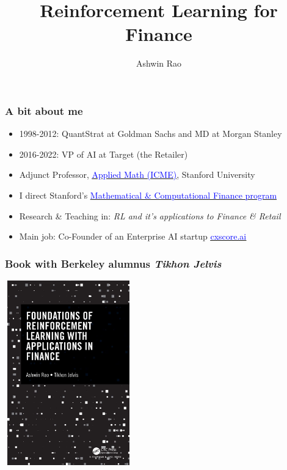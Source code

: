 \documentclass[handout]{beamer}
\title[RL for Finance]{Reinforcement Learning for Finance} %
\author{Ashwin Rao} %
\institute[Stanford] %
{Institute for Computational and Mathematical Engineering\\
Stanford University
}
\date{} %
\begin{document}
\begin{frame}
\titlepage %
\end{frame}



\begin{frame}
\frametitle{A bit about me}
\pause
\begin{itemize}[<+->]
\item 1998-2012: QuantStrat at Goldman Sachs and MD at Morgan Stanley
\item 2016-2022: VP of AI at Target (the Retailer)
\item Adjunct Professor, \href{https://icme.stanford.edu/}{\underline{\textcolor{blue}{Applied Math (ICME)}}}, Stanford University
\item I direct Stanford's \href{https://mcf.stanford.edu/}{\underline{\textcolor{blue}{Mathematical \& Computational Finance program}}}
\item Research \& Teaching in: {\em RL and it's applications to Finance \& Retail}
\item Main job: Co-Founder of an Enterprise AI startup \href{http://cxscore.ai}{\underline{\textcolor{blue}{cxscore.ai}}} 
\end{itemize}
\end{frame}

\begin{frame}
\frametitle{Book with Berkeley alumnus {\em Tikhon Jelvis}}
\begin{center}
\includegraphics[width=5.5cm, height=8cm]{RLBook.jpeg}
\end{center}
\end{frame}
\end{document}
